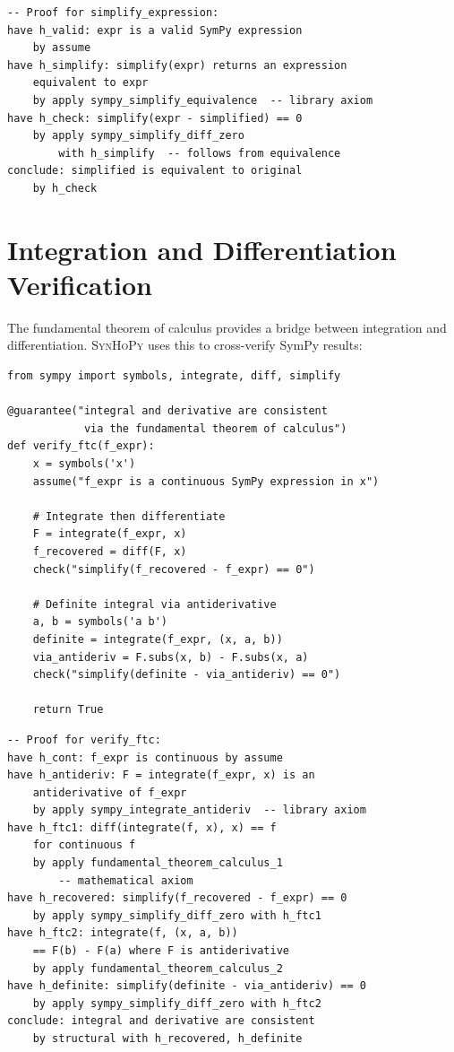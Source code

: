 \documentclass[11pt,a4paper]{report}
\theoremstyle{definition}
\theoremstyle{plain}
\newcommand{\synhopy}{\textsc{SynHoPy}}
\begin{document}
\begin{lstlisting}[style=proof]
-- Proof for simplify_expression:
have h_valid: expr is a valid SymPy expression
    by assume
have h_simplify: simplify(expr) returns an expression
    equivalent to expr
    by apply sympy_simplify_equivalence  -- library axiom
have h_check: simplify(expr - simplified) == 0
    by apply sympy_simplify_diff_zero
        with h_simplify  -- follows from equivalence
conclude: simplified is equivalent to original
    by h_check
\end{lstlisting}

\section{Integration and Differentiation Verification}

The fundamental theorem of calculus provides a bridge between integration
and differentiation.  \synhopy{} uses this to cross-verify SymPy results:

\begin{lstlisting}[style=synhopy]
from sympy import symbols, integrate, diff, simplify

@guarantee("integral and derivative are consistent
            via the fundamental theorem of calculus")
def verify_ftc(f_expr):
    x = symbols('x')
    assume("f_expr is a continuous SymPy expression in x")

    # Integrate then differentiate
    F = integrate(f_expr, x)
    f_recovered = diff(F, x)
    check("simplify(f_recovered - f_expr) == 0")

    # Definite integral via antiderivative
    a, b = symbols('a b')
    definite = integrate(f_expr, (x, a, b))
    via_antideriv = F.subs(x, b) - F.subs(x, a)
    check("simplify(definite - via_antideriv) == 0")

    return True
\end{lstlisting}

\begin{lstlisting}[style=proof]
-- Proof for verify_ftc:
have h_cont: f_expr is continuous by assume
have h_antideriv: F = integrate(f_expr, x) is an
    antiderivative of f_expr
    by apply sympy_integrate_antideriv  -- library axiom
have h_ftc1: diff(integrate(f, x), x) == f
    for continuous f
    by apply fundamental_theorem_calculus_1
        -- mathematical axiom
have h_recovered: simplify(f_recovered - f_expr) == 0
    by apply sympy_simplify_diff_zero with h_ftc1
have h_ftc2: integrate(f, (x, a, b))
    == F(b) - F(a) where F is antiderivative
    by apply fundamental_theorem_calculus_2
have h_definite: simplify(definite - via_antideriv) == 0
    by apply sympy_simplify_diff_zero with h_ftc2
conclude: integral and derivative are consistent
    by structural with h_recovered, h_definite
\end{lstlisting}
\end{document}
